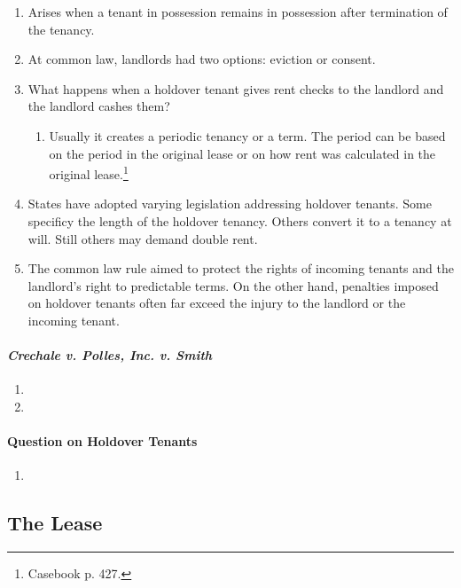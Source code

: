 \begin{enumerate}
    \item Arises when a tenant in possession remains in possession after 
    termination of the tenancy.
    \item At common law, landlords had two options: eviction or consent.
    \item What happens when a holdover tenant gives rent checks to the 
    landlord and the landlord cashes them?
    \begin{enumerate}
        \item Usually it creates a periodic tenancy or a term. The period can 
        be based on the period in the original lease or on how rent was 
        calculated in the original lease.\footnote{Casebook p. 427.}
    \end{enumerate}
    \item States have adopted varying legislation addressing holdover tenants. 
    Some specificy the length of the holdover tenancy. Others convert it to a 
    tenancy at will. Still others may demand double rent.
    \item The common law rule aimed to protect the rights of incoming tenants 
    and the landlord's right to predictable terms. On the other hand, 
    penalties imposed on holdover tenants often far exceed the injury to the 
    landlord or the incoming tenant.
\end{enumerate}

\paragraph{\emph{Crechale v. Polles, Inc. v. Smith}}

\begin{enumerate}
    \item %
    \item %
\end{enumerate}

\paragraph{Question on Holdover Tenants}

\begin{enumerate}
    \item %
\end{enumerate}

\subsection{The Lease}

